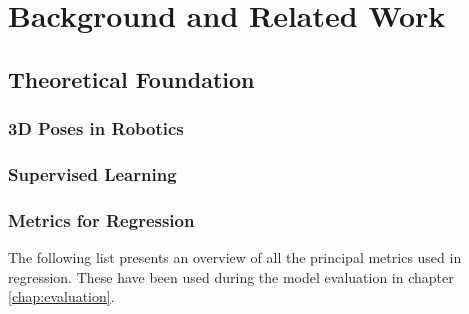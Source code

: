 \chapter{Background and Related Work}
\label{chap:theory}

\glsresetall




\section{Theoretical Foundation}

\subsection{3D Poses in Robotics}
\label{subsec:robot-pose}


\subsection{Supervised Learning}
\label{subsec:supervised-learning}


\subsection{Metrics for Regression}
\label{subsec:metrics}

The following list presents an overview of all the principal metrics used in regression. These have been used during the model evaluation in chapter \ref{chap:evaluation}.

